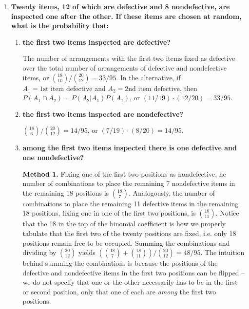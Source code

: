 \documentclass[10pt, oneside]{article}   	%
\theoremstyle{definition}
\begin{document}
\begin{enumerate}[label=3.\arabic*]
\item  \begin{tcolorbox}[
  colback=Cerulean!5!white,
  colframe=Cerulean!75!black]
\textbf{Twenty items, 12 of which are defective and 8 nondefective, are inspected one after the other. If these items are chosen at random, what is the probability that:}
\end{tcolorbox}

	\begin{enumerate}

	\item  \begin{tcolorbox}[
	  colback=Cerulean!5!white,
	  colframe=Cerulean!75!black]
	\textbf{the first two items inspected are defective?}
	\end{tcolorbox}
	
	The number of arrangements with the first two items fixed as defective over the total number of arrangements of defective and nondefective items, or $\binom{18}{10} / \binom{20}{12} = \boxed{33/95}$. In the alternative, if $A_1 = \text{1st item defective}$ and $A_2 = \text{2nd item defective}$, then $P(A_1 \cap A_2) = P(A_2 | A_1) P(A_1)$, or $(11/19) \cdot (12/20) = \boxed{33/95}$.
	
	\item  \begin{tcolorbox}[
	  colback=Cerulean!5!white,
	  colframe=Cerulean!75!black]
	\textbf{the first two items inspected are nondefective?}
	\end{tcolorbox}
	
	$\binom{18}{6} / \binom{20}{12} = \boxed{14/95}$, or $(7/19) \cdot (8/20) = \boxed{14/95}$.
	
	\item  \begin{tcolorbox}[
	  colback=Cerulean!5!white,
	  colframe=Cerulean!75!black]
	\textbf{among the first two items inspected there is one defective and one nondefective?}
	\end{tcolorbox}
	
	\textbf{Method 1.} Fixing one of the first two positions as nondefective, he number of combinations to place the remaining 7 nondefective items in the remaining 18 positions is $\binom{18}{7}$. Analogously, the number of combinations to place the remaining 11 defective items in the remaining 18 positions, fixing one in one of the first two positions, is $\binom{18}{11}$. Notice that the 18 in the top of the binomial coefficient is how we properly tabulate that the first two of the twenty positions are fixed, i.e. only 18 positions remain free to be occupied. Summing the combinations and dividing by $\binom{20}{12}$ yields $( \binom{18}{7} + \binom{18}{11} ) / \binom{20}{12} = \boxed{48/95}$. The intuition behind summing the combinations is because the positions of the defective and nondefective items in the first two positions can be flipped -- we do not specify that one or the other necessarily has to be in the first or second position, only that one of each are \textit{among} the first two positions. 
	

\end{enumerate}
\end{enumerate}
\end{document}
